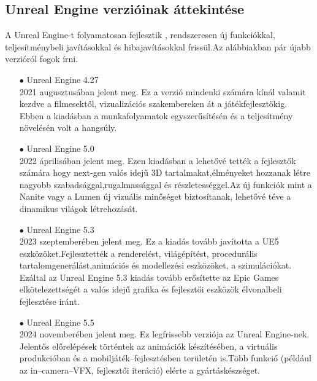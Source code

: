 \documentclass[
]{thesis-ekf}
\theoremstyle{definition}
\theoremstyle{remark}
\begin{document}
\subsection{Unreal Engine verzióinak áttekintése}
A Unreal Engine-t folyamatosan fejlesztik , rendszeresen új funkciókkal, teljesítménybeli javításokkal és hibajavításokkal frissül.Az alábbiakban pár újabb verzióról fogok írni.
\begin{itemize}
	\item[$\bullet$]Unreal Engine 4.27 \\ 2021 augusztusában jelent meg. Ez a verzió mindenki számára kínál valamit kezdve a filmesektől, vizualizációs szakembereken át a játékfejlesztőkig. Ebben a kiadásban a munkafolyamatok egyszerűsítésén és a teljesítmény növelésén volt a hangsúly.\cite{Unreal4.27}
	\item[$\bullet$]Unreal Engine 5.0 \\ 2022 áprilisában jelent meg. Ezen kiadásban a lehetővé tették a fejlesztők számára hogy next-gen valós idejű 3D tartalmakat,élményeket hozzanak létre nagyobb szabadsággal,rugalmassággal és részletességgel.Az új funkciók mint a Nanite vagy a Lumen új vizuális minőséget biztosítanak, lehetővé téve a dinamikus világok létrehozását.\cite{Unreal5.0}
	\item[$\bullet$]Unreal Engine 5.3 \\ 2023 szeptemberében jelent meg. Ez a kiadás tovább javította a UE5 eszközöket.Fejlesztették a renderelést, világépítést, procedurális tartalomgenerálást,animációs és modellezési eszközöket, a szimulációkat. Ezáltal az Unreal Engine 5.3 kiadás tovább erősítette az Epic Games elkötelezettségét a valós idejű grafika és fejlesztői eszközök élvonalbeli fejlesztése iránt.\cite{Unreal5.3}
	\item[$\bullet$]Unreal Engine 5.5 \\ 2024 novemberében jelent meg. Ez legfrissebb verziója az Unreal Engine-nek. Jelentős előrelépések történtek az animációk készítésében, a virtuális produkcióban és a mobiljáték--fejlesztésben területén is.Több funkció (például az in--camera--VFX, fejlesztői iteráció) elérte a gyártáskészséget. \cite{Unreal5.5}
\end{itemize}
\end{document}
